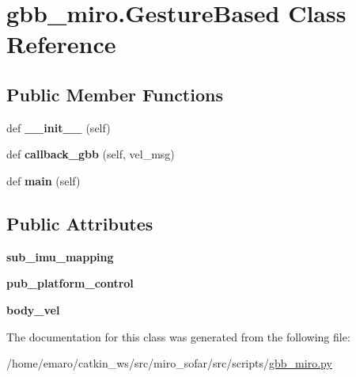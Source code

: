 \hypertarget{classgbb__miro_1_1GestureBased}{}\section{gbb\+\_\+miro.\+Gesture\+Based Class Reference}
\label{classgbb__miro_1_1GestureBased}
\subsection*{Public Member Functions}
\begin{DoxyCompactItemize}
\item 
\mbox{\label{classgbb__miro_1_1GestureBased_a07f79eb00b603ad746d6207e90cb7a7c}} 
def {\bfseries \+\_\+\+\_\+init\+\_\+\+\_\+} (self)
\item 
\mbox{\label{classgbb__miro_1_1GestureBased_a8e1b7b744c86c469224b221ba048c1eb}} 
def {\bfseries callback\+\_\+gbb} (self, vel\+\_\+msg)
\item 
\mbox{\label{classgbb__miro_1_1GestureBased_a47f54767f7a09c1e316bfe935c553eb5}} 
def {\bfseries main} (self)
\end{DoxyCompactItemize}
\subsection*{Public Attributes}
\begin{DoxyCompactItemize}
\item 
\mbox{\label{classgbb__miro_1_1GestureBased_a7dcbe92c3a3f519aadb2100611307a4b}} 
{\bfseries sub\+\_\+imu\+\_\+mapping}
\item 
\mbox{\label{classgbb__miro_1_1GestureBased_a55c8badeade411056ded86b61cc10062}} 
{\bfseries pub\+\_\+platform\+\_\+control}
\item 
\mbox{\label{classgbb__miro_1_1GestureBased_a843b6c194d6a1eaf1ebd1b64a9640029}} 
{\bfseries body\+\_\+vel}
\end{DoxyCompactItemize}


The documentation for this class was generated from the following file\+:\begin{DoxyCompactItemize}
\item 
/home/emaro/catkin\+\_\+ws/src/miro\+\_\+sofar/src/scripts/\mbox{\hyperlink{gbb__miro_8py}{gbb\+\_\+miro.\+py}}\end{DoxyCompactItemize}
